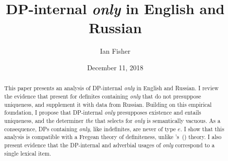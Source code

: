 \documentclass{article}
\title{DP-internal \textit{only} in English and Russian}
\author{Ian Fisher}
\date{December 11, 2018}
\newcommand{\citegen}[1]{\citeauthor{#1}'s~(\citeyear{#1})}
\begin{document}
\maketitle

\begin{abstract}
This paper presents an analysis of DP-internal \textit{only} in English and Russian. I review the evidence that \citet{cb2012b, cb2015} present for definites containing \textit{only} that do not presuppose uniqueness, and supplement it with data from Russian. Building on this empirical foundation, I propose that DP-internal \textit{only} presupposes existence and entails uniqueness, and the determiner \textit{the} that selects for \textit{only} is semantically vacuous. As a consequence, DPs containing \textit{only}, like indefinites, are never of type $e$. I show that this analysis is compatible with a Fregean theory of definiteness, unlike \citegen{cb2015} theory. I also present evidence that the DP-internal and adverbial usages of \textit{only} correspond to a single lexical item.
\end{abstract}












\end{document}
